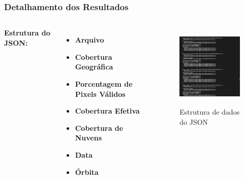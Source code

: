 \documentclass{beamer}
\begin{document}
\begin{frame}
    \frametitle{Detalhamento dos Resultados}
    \begin{columns}
        \textbf{Estrutura do JSON:}
        \begin{itemize}\setlength{\itemsep}{0pt}
            \item \textbf{Arquivo}
            \item \textbf{Cobertura Geográfica}
            \item \textbf{Porcentagem de Pixels Válidos} 
            \item \textbf{Cobertura Efetiva} 
            \item \textbf{Cobertura de Nuvens} 
            \item \textbf{Data}
            \item \textbf{Órbita}
        \end{itemize}
        
        \begin{figure}
            \includegraphics[width=\linewidth,height=4cm,keepaspectratio]{images/json.png}
            \caption{\footnotesize Estrutura de dados do JSON}
        \end{figure}
    \end{columns}
\end{frame}
\end{document}
